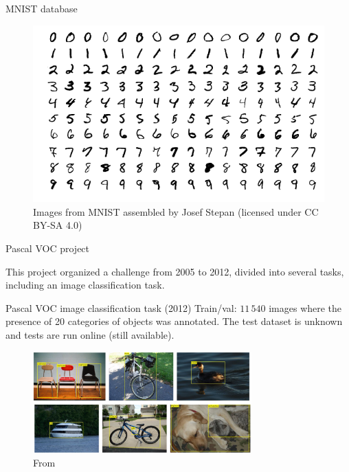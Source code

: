 \documentclass[xcolor=pdftex,dvipsnames,table,mathserif]{beamer}
\begin{document}
\begin{frame}{MNIST database}

\begin{figure}[ht]
  \centering
  \includegraphics[width=\textwidth]{mnist_examples.png}
  \caption{\tiny{Images from MNIST assembled by Josef Stepan (licensed under CC BY-SA 4.0)} }
\end{figure}


\end{frame}

\begin{frame}{Pascal VOC project \tiny{\cite{everingham_pascal_2010, everingham_pascal_2014}}}

  This project organized a challenge from 2005 to 2012, divided into several tasks, including an image classification task.

  \begin{block}{Pascal VOC image classification task (2012)}
    Train/val: $11\,540$ images where the presence of 20 categories of objects was annotated. The test dataset is unknown and tests are run online (still available).
  \end{block}

  \begin{figure}[ht]
    \centering
    \includegraphics[width=0.75\textwidth]{pascal_examples.png}
    \caption{\tiny{From \cite{everingham_pascal_2014}}}
  \end{figure}


\end{frame}
\end{document}
